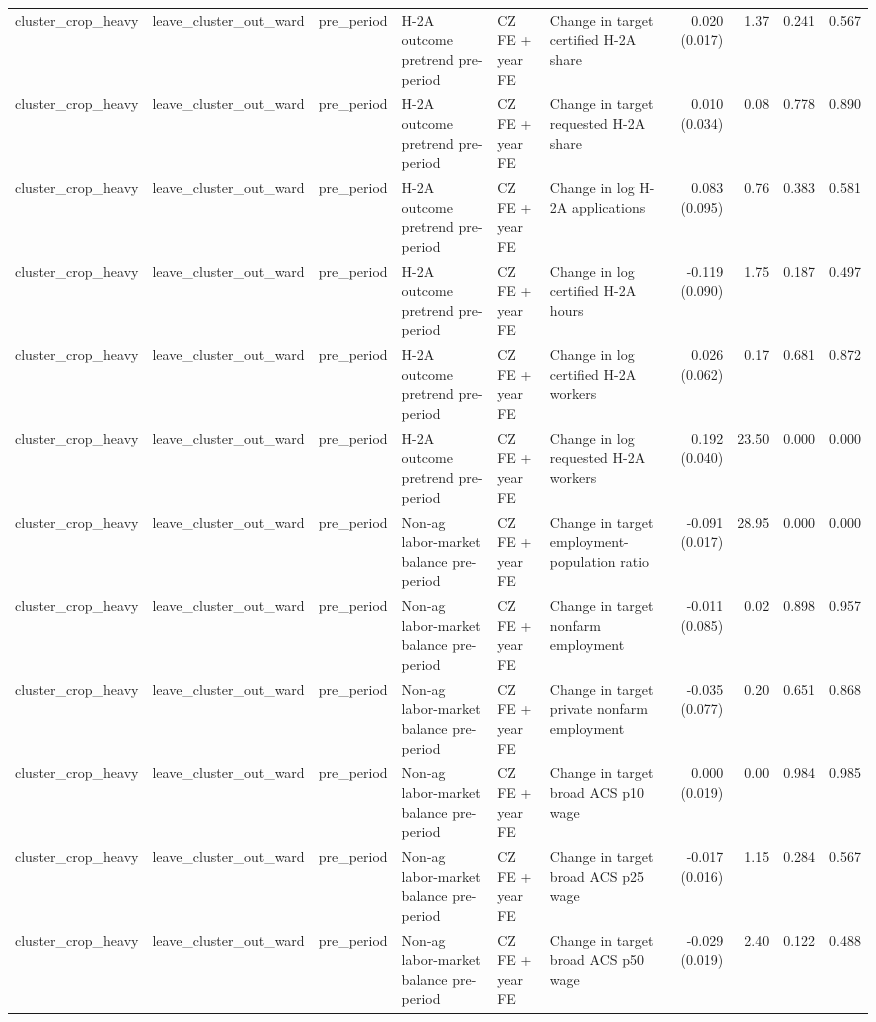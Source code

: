 \begin{tabular}{llllllrrrr}
cluster_crop_heavy & leave_cluster_out_ward & pre_period & H-2A outcome pretrend pre-period & CZ FE + year FE & Change in target certified H-2A share & 0.020 (0.017) & 1.37 & 0.241 & 0.567 \\
cluster_crop_heavy & leave_cluster_out_ward & pre_period & H-2A outcome pretrend pre-period & CZ FE + year FE & Change in target requested H-2A share & 0.010 (0.034) & 0.08 & 0.778 & 0.890 \\
cluster_crop_heavy & leave_cluster_out_ward & pre_period & H-2A outcome pretrend pre-period & CZ FE + year FE & Change in log H-2A applications & 0.083 (0.095) & 0.76 & 0.383 & 0.581 \\
cluster_crop_heavy & leave_cluster_out_ward & pre_period & H-2A outcome pretrend pre-period & CZ FE + year FE & Change in log certified H-2A hours & -0.119 (0.090) & 1.75 & 0.187 & 0.497 \\
cluster_crop_heavy & leave_cluster_out_ward & pre_period & H-2A outcome pretrend pre-period & CZ FE + year FE & Change in log certified H-2A workers & 0.026 (0.062) & 0.17 & 0.681 & 0.872 \\
cluster_crop_heavy & leave_cluster_out_ward & pre_period & H-2A outcome pretrend pre-period & CZ FE + year FE & Change in log requested H-2A workers & 0.192 (0.040) & 23.50 & 0.000 & 0.000 \\
cluster_crop_heavy & leave_cluster_out_ward & pre_period & Non-ag labor-market balance pre-period & CZ FE + year FE & Change in target employment-population ratio & -0.091 (0.017) & 28.95 & 0.000 & 0.000 \\
cluster_crop_heavy & leave_cluster_out_ward & pre_period & Non-ag labor-market balance pre-period & CZ FE + year FE & Change in target nonfarm employment & -0.011 (0.085) & 0.02 & 0.898 & 0.957 \\
cluster_crop_heavy & leave_cluster_out_ward & pre_period & Non-ag labor-market balance pre-period & CZ FE + year FE & Change in target private nonfarm employment & -0.035 (0.077) & 0.20 & 0.651 & 0.868 \\
cluster_crop_heavy & leave_cluster_out_ward & pre_period & Non-ag labor-market balance pre-period & CZ FE + year FE & Change in target broad ACS p10 wage & 0.000 (0.019) & 0.00 & 0.984 & 0.985 \\
cluster_crop_heavy & leave_cluster_out_ward & pre_period & Non-ag labor-market balance pre-period & CZ FE + year FE & Change in target broad ACS p25 wage & -0.017 (0.016) & 1.15 & 0.284 & 0.567 \\
cluster_crop_heavy & leave_cluster_out_ward & pre_period & Non-ag labor-market balance pre-period & CZ FE + year FE & Change in target broad ACS p50 wage & -0.029 (0.019) & 2.40 & 0.122 & 0.488 \\

\end{tabular}
